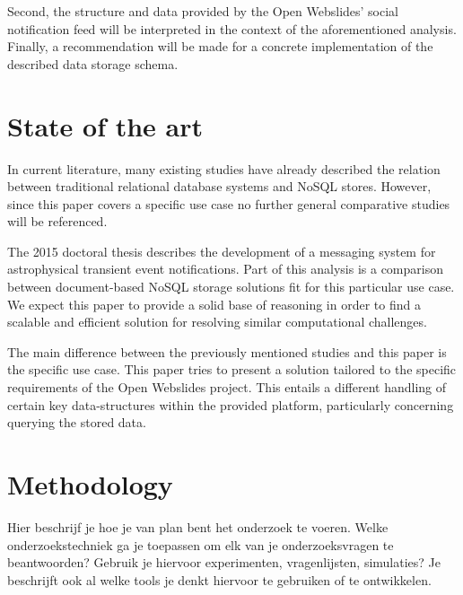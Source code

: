 \documentclass[fleqn,10pt]{voorstel}
\begin{document}
Second, the structure and data provided by the Open Webslides' social notification feed will be interpreted in the context of the aforementioned analysis. Finally, a recommendation will be made for a concrete implementation of the described data storage schema.


\section{State of the art}
\label{sec:state-of-the-art}

In current literature, many existing studies have already described the relation between traditional relational database systems and NoSQL stores. However, since this paper covers a specific use case no further general comparative studies will be referenced.

The 2015 doctoral thesis \autocite{Zhao2015} describes the development of a messaging system for astrophysical transient event notifications. Part of this analysis is a comparison between document-based NoSQL storage solutions fit for this particular use case. We expect this paper to provide a solid base of reasoning in order to find a scalable and efficient solution for resolving similar computational challenges.

The main difference between the previously mentioned studies and this paper is the specific use case. This paper tries to present a solution tailored to the specific requirements of the Open Webslides project. This entails a different handling of certain key data-structures within the provided platform, particularly concerning querying the stored data.


\section{Methodology}
\label{sec:methodology}

Hier beschrijf je hoe je van plan bent het onderzoek te voeren. Welke onderzoekstechniek ga je toepassen om elk van je onderzoeksvragen te beantwoorden? Gebruik je hiervoor experimenten, vragenlijsten, simulaties? Je beschrijft ook al welke tools je denkt hiervoor te gebruiken of te ontwikkelen.
\end{document}
